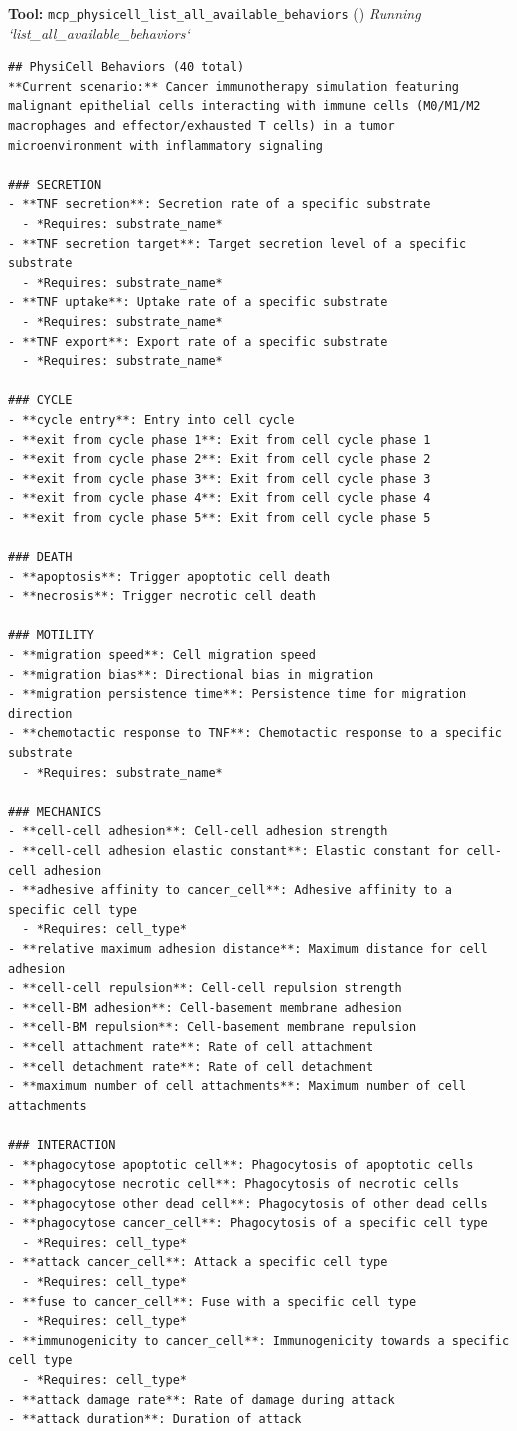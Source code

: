\documentclass[11pt,a4paper]{article}
\begin{document}
\begin{toolokbox}
\textbf{Tool:} \texttt{mcp\_physicell\_list\_all\_available\_behaviors} (\checkmark)
\textit{Running `list\_all\_available\_behaviors`}
\begin{lstlisting}
## PhysiCell Behaviors (40 total)
**Current scenario:** Cancer immunotherapy simulation featuring malignant epithelial cells interacting with immune cells (M0/M1/M2 macrophages and effector/exhausted T cells) in a tumor microenvironment with inflammatory signaling

### SECRETION
- **TNF secretion**: Secretion rate of a specific substrate
  - *Requires: substrate_name*
- **TNF secretion target**: Target secretion level of a specific substrate
  - *Requires: substrate_name*
- **TNF uptake**: Uptake rate of a specific substrate
  - *Requires: substrate_name*
- **TNF export**: Export rate of a specific substrate
  - *Requires: substrate_name*

### CYCLE
- **cycle entry**: Entry into cell cycle
- **exit from cycle phase 1**: Exit from cell cycle phase 1
- **exit from cycle phase 2**: Exit from cell cycle phase 2
- **exit from cycle phase 3**: Exit from cell cycle phase 3
- **exit from cycle phase 4**: Exit from cell cycle phase 4
- **exit from cycle phase 5**: Exit from cell cycle phase 5

### DEATH
- **apoptosis**: Trigger apoptotic cell death
- **necrosis**: Trigger necrotic cell death

### MOTILITY
- **migration speed**: Cell migration speed
- **migration bias**: Directional bias in migration
- **migration persistence time**: Persistence time for migration direction
- **chemotactic response to TNF**: Chemotactic response to a specific substrate
  - *Requires: substrate_name*

### MECHANICS
- **cell-cell adhesion**: Cell-cell adhesion strength
- **cell-cell adhesion elastic constant**: Elastic constant for cell-cell adhesion
- **adhesive affinity to cancer_cell**: Adhesive affinity to a specific cell type
  - *Requires: cell_type*
- **relative maximum adhesion distance**: Maximum distance for cell adhesion
- **cell-cell repulsion**: Cell-cell repulsion strength
- **cell-BM adhesion**: Cell-basement membrane adhesion
- **cell-BM repulsion**: Cell-basement membrane repulsion
- **cell attachment rate**: Rate of cell attachment
- **cell detachment rate**: Rate of cell detachment
- **maximum number of cell attachments**: Maximum number of cell attachments

### INTERACTION
- **phagocytose apoptotic cell**: Phagocytosis of apoptotic cells
- **phagocytose necrotic cell**: Phagocytosis of necrotic cells
- **phagocytose other dead cell**: Phagocytosis of other dead cells
- **phagocytose cancer_cell**: Phagocytosis of a specific cell type
  - *Requires: cell_type*
- **attack cancer_cell**: Attack a specific cell type
  - *Requires: cell_type*
- **fuse to cancer_cell**: Fuse with a specific cell type
  - *Requires: cell_type*
- **immunogenicity to cancer_cell**: Immunogenicity towards a specific cell type
  - *Requires: cell_type*
- **attack damage rate**: Rate of damage during attack
- **attack duration**: Duration of attack


\end{lstlisting}
\end{toolokbox}
\end{document}

